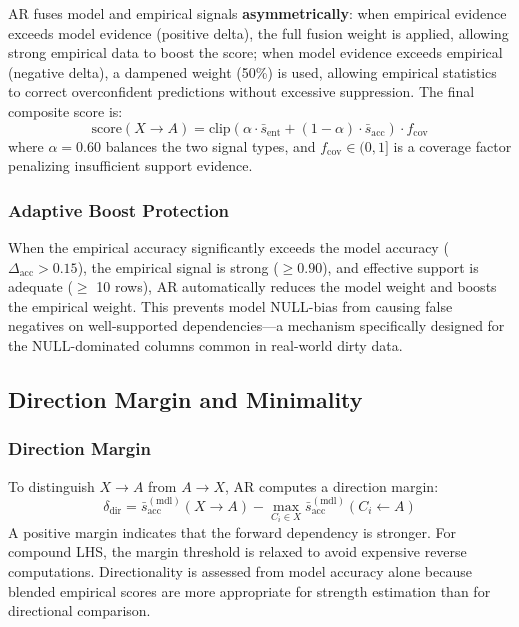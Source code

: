 \documentclass[conference]{IEEEtran}
\begin{document}
AR fuses model and empirical signals \textbf{asymmetrically}: when empirical evidence exceeds model evidence (positive delta), the full fusion weight is applied, allowing strong empirical data to boost the score; when model evidence exceeds empirical (negative delta), a dampened weight (50\%) is used, allowing empirical statistics to correct overconfident predictions without excessive suppression. The final composite score is:
\begin{equation}
    \text{score}(X \to A) = \text{clip}\!\left(\alpha \cdot \bar{s}_{\text{ent}} + (1 - \alpha) \cdot \bar{s}_{\text{acc}}\right) \cdot f_{\text{cov}}
\end{equation}
where $\alpha = 0.60$ balances the two signal types, and $f_{\text{cov}} \in (0, 1]$ is a coverage factor penalizing insufficient support evidence.

\subsubsection{Adaptive Boost Protection}
When the empirical accuracy significantly exceeds the model accuracy ($\Delta_{\text{acc}} > 0.15$), the empirical signal is strong ($\geq 0.90$), and effective support is adequate ($\geq$ 10 rows), AR automatically reduces the model weight and boosts the empirical weight. This prevents model NULL-bias from causing false negatives on well-supported dependencies---a mechanism specifically designed for the NULL-dominated columns common in real-world dirty data.

\subsection{Direction Margin and Minimality}\label{sec:direction}

\subsubsection{Direction Margin}
To distinguish $X \to A$ from $A \to X$, AR computes a direction margin:
\begin{equation}
    \delta_{\text{dir}} = \bar{s}_{\text{acc}}^{(\text{mdl})}(X \to A) - \max_{C_i \in X} \bar{s}_{\text{acc}}^{(\text{mdl})}(C_i \leftarrow A)
\end{equation}
A positive margin indicates that the forward dependency is stronger. For compound LHS, the margin threshold is relaxed to avoid expensive reverse computations. Directionality is assessed from model accuracy alone because blended empirical scores are more appropriate for strength estimation than for directional comparison.
\end{document}
